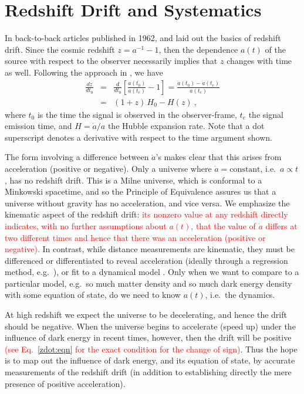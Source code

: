 \documentclass[preprint2, 10pt]{aastex}
\newcommand{\bea}{\begin{eqnarray}}
\newcommand{\eea}{\end{eqnarray}}
\begin{document}
\section{Redshift Drift and Systematics} \label{sec:basic} 

In back-to-back articles published in 1962, \citet{mcvittie} and 
\citet{sandage} laid out the basics of redshift drift.  Since the 
cosmic redshift $z=a^{-1}-1$, then the dependence $a(t)$ of the source with 
respect to the observer necessarily implies that $z$ changes with time as 
well. Following the approach in \citet{fpoc}, we have 
\bea 
\frac{dz}{dt_0}&=&\frac{d}{dt_0}\left[\frac{a(t_0)}{a(t_e)}-1\right] 
=\frac{\dot a(t_0)-\dot a (t_e)}{a(t_e)}\\ 
&=&(1+z)\,H_0-H(z)\ , \label{zdot:eqn}
\eea 
where $t_0$ is the time the signal is observed in the observer-frame, 
$t_e$ the signal emission time, and $H=\dot a/a$ the Hubble expansion rate. 
Note that a dot superscript denotes a derivative with respect to the 
time argument shown. 

The form involving a difference 
between $\dot a$'s makes clear that this arises from acceleration (positive 
or negative).
Only a universe where $\dot a=\mbox{constant}$, i.e.\ $a\propto t$, 
has no redshift drift.  This is a Milne universe, which is conformal to a 
Minkowski spacetime, and so the Principle of Equivalence assures us that 
a universe without gravity has no acceleration, and vice versa. 
We emphasize the kinematic aspect of the redshift drift:
\textcolor{red}{
its nonzero 
value at any redshift directly indicates,
with no further assumptions about $a(t)$,
that the value of $\dot{a}$ differs at two different times and hence that there was an acceleration
(positive or negative).
} 
In contrast, while distance measurements are kinematic, they must be differenced or 
differentiated to reveal acceleration (ideally through a regression 
method, e.g.\ \citet{2012PhRvD..85l3530S,2012JCAP...06..036S}), or fit to 
a dynamical model \citep{1998AJ....116.1009R,1999ApJ...517..565P}. 
Only when we want to compare 
to a particular model, e.g.\ so much matter density and so much dark energy 
density with some equation of state, do we need to know $a(t)$, i.e.\ the dynamics.


At high redshift we expect the universe to be decelerating, and hence 
the drift should be negative.  When the universe begins to accelerate 
(speed up) under the influence of dark energy in recent times, however, 
then the drift will be positive
\textcolor{red}{
(see Eq.~\ref{zdot:eqn} for the exact condition for the change of sign)}.  Thus the hope is to map out the 
influence of dark energy, and its equation of state, by accurate 
measurements of the redshift drift (in addition to establishing directly 
the mere presence of positive acceleration). 
\end{document}
